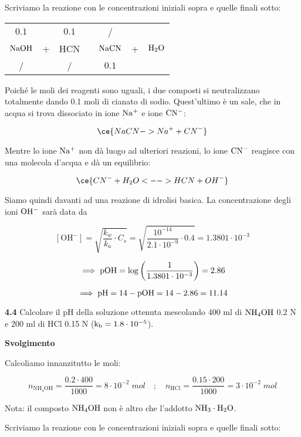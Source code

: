 Scriviamo la reazione con le concentrazioni iniziali sopra e quelle finali sotto:

\begin{center}
    \begin{tabular}{ccccccc}
        $0.1$ &  & $0.1$ & & / &&\\
        $\rm NaOH$ & + & HCN & \ce{->} & $\rm NaCN$ & + & $\rm H_2O$\\
        / &  &  / & & $0.1$ &&\\
    \end{tabular}
\end{center}

Poiché le moli dei reagenti sono uguali, i due composti si neutralizzano totalmente dando 0.1 moli di cianato di sodio. Quest'ultimo è un sale, che in acqua si trova dissociato in ione $\rm Na^+$ e ione $\rm CN^-$:

$$\ce{NaCN -> Na^+ + CN^-}$$

Mentre lo ione $\rm Na^+$ non dà luogo ad ulteriori reazioni, lo ione $\rm CN^-$ reagisce con una molecola d'acqua e dà un equilibrio:

$$\ce{CN^- + H_2O <--> HCN + OH^-}$$

Siamo quindi davanti ad una reazione di idrolisi basica. La concentrazione degli ioni $\rm OH^-$ sarà data da

$$[\text{OH}^-]
=\sqrt{\frac{k_w}{k_a}\cdot C_s}
=\sqrt{\frac{10^{-14}}{2.1 \cdot 10^{-9}} \cdot 0.4}
=1.3801 \cdot 10^{-3}$$

$$\implies \rm pOH
=\log{\left(\frac{1}{1.3801 \cdot 10^{-3}}\right)}
=2.86$$

$$\implies \rm pH=14-pOH=14-2.86=11.14$$

\textbf{4.4} Calcolare il pH della soluzione ottenuta mescolando 400 ml di $\rm NH_4OH$ 0.2 N e 200 ml di HCl 0.15 N ($\rm k_b = 1.8 \cdot 10^{-5}$).

\vspace{0.2cm}\large\textbf{Svolgimento}\normalsize

\vspace{0.2cm}Calcoliamo innanzitutto le moli:

$$n_{\text{NH}_4\text{OH}}=\frac{0.2 \cdot 400}{1000}=8 \cdot 10^{-2} \; mol
\quad ; \quad
n_{\text{HCl}}=\frac{0.15 \cdot 200}{1000}=3 \cdot 10^{-2} \; mol$$

Nota: il composto $\rm NH_4OH$ non è altro che l'addotto $\rm NH_3 \cdot H_2O$.

Scriviamo la reazione con le concentrazioni iniziali sopra e quelle finali sotto:

